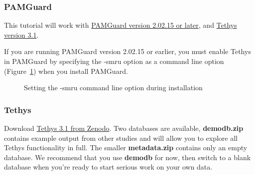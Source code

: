 \documentclass[
]{article}
\begin{document}
\subsubsection{PAMGuard}\label{sec-installpamguard}

This tutorial will work with
\href{https://www.pamguard.org/downloadsurvey.html}{PAMGuard version
2.02.15 or later}, and \href{https://zenodo.org/records/13626338}{Tethys
version 3.1}.

If you are running PAMGuard version 2.02.15 or earlier, you must enable
Tethys in PAMGuard by specifying the -smru option as a command line
option (Figure~\ref{fig-smru}) when you install PAMGuard.

\begin{figure}


\caption{\label{fig-smru}Setting the -smru command line option during
installation}

\end{figure}%

\subsubsection{Tethys}\label{tethys}

Download \href{https://zenodo.org/records/13626338}{Tethys 3.1 from
Zenodo}. Two databases are available, \textbf{demodb.zip} contains
example output from other studies and will allow you to explore all
Tethys functionality in full. The smaller \textbf{metadata.zip} contains
only an empty database. We recommend that you use \textbf{demodb} for
now, then switch to a blank database when you're ready to start serious
work on your own data.
\end{document}
